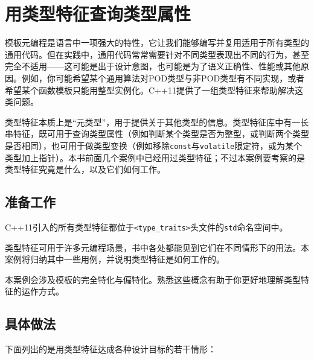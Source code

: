 
\section{用类型特征查询类型属性}



模板元编程是语言中一项强大的特性，它让我们能够编写并复用适用于所有类型的通用代码。但在实践中，通用代码常常需要针对不同类型表现出不同的行为，甚至完全不适用——这可能是出于设计意图，也可能是为了语义正确性、性能或其他原因。例如，你可能希望某个通用算法对POD类型与非POD类型有不同实现，或者希望某个函数模板只能用整型实例化。C++11提供了一组类型特征来帮助解决这类问题。



类型特征本质上是“元类型”，用于提供关于其他类型的信息。类型特征库中有一长串特征，既可用于查询类型属性（例如判断某个类型是否为整型，或判断两个类型是否相同），也可用于做类型变换（例如移除\texttt{const}与\texttt{volatile}限定符，或为某个类型加上指针）。本书前面几个案例中已经用过类型特征；不过本案例要考察的是类型特征究竟是什么，以及它们如何工作。



\subsection{准备工作}



C++11引入的所有类型特征都位于\texttt{<\allowbreak{}type\_\allowbreak{}traits>}头文件的\texttt{std}命名空间中。



类型特征可用于许多元编程场景，书中各处都能见到它们在不同情形下的用法。本案例将归纳其中一些用例，并说明类型特征是如何工作的。



本案例会涉及模板的完全特化与偏特化。熟悉这些概念有助于你更好地理解类型特征的运作方式。



\subsection{具体做法}



下面列出的是用类型特征达成各种设计目标的若干情形：



